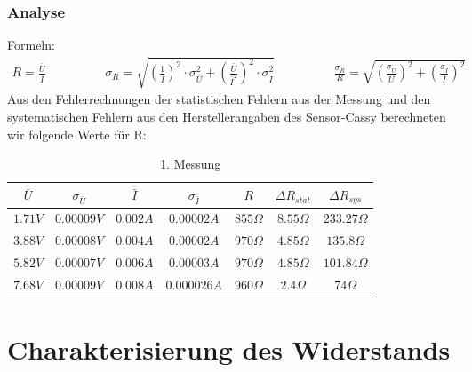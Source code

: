 \documentclass[12pt,a4paper]{article}
\begin{document}
\subsubsection{Analyse}
Formeln:
\begin{align*}
R=\frac{\bar{U}}{\bar{I}} \hspace{2cm} 
\sigma_R=\sqrt{(\frac{1}{\bar{I}})^{2} \cdot \sigma_{\bar{U}}^{2}+(\frac{\bar{U}}{\bar{I}^2})^{2} \cdot \sigma_{\bar{I}}^{2}} \hspace{2cm}\frac{\sigma_R}{R}=\sqrt{(\frac{\sigma_{\bar{U}}}{\bar{U}})^2+(\frac{\sigma_{\bar{I}}}{\bar{I}})^2}
\end{align*}
Aus den Fehlerrechnungen der statistischen Fehlern aus der Messung und den systematischen Fehlern aus den Herstellerangaben des Sensor-Cassy berechneten wir folgende Werte für R:
\begin{table}[H]\centering
\caption{1. Messung}
\begin{tabular}{c|c|c|c|c|c|c}
$\bar{U}$& $\sigma_{\bar{U}}$& $\bar{I}$& $\sigma_{\bar{I}}$& $R$& $\Delta R_{stat}$& $\Delta R_{sys}$ \\ \hline
$1.71V$& $0.00009V$& $0.002A$& $0.00002A$& $855\Omega$& $8.55\Omega$& $233.27\Omega$\\ 
$3.88V$& $0.00008V$& $0.004A$& $0.00002A$& $970\Omega$& $4.85\Omega$& $135.8\Omega$\\ 
$5.82V$& $0.00007V$& $0.006A$& $0.00003A$& $970\Omega$& $4.85\Omega$& $101.84\Omega$ \\
$7.68V$& $0.00009V$& $0.008A$& $0.000026A$& $960\Omega$& $2.4\Omega$& $74\Omega$ \\
\end{tabular} 
\end{table}
\section{Charakterisierung des Widerstands}
\end{document}

